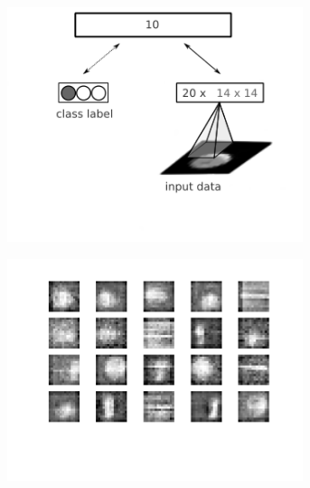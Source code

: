 \begin{figure}[h!]
	\centering
	\begin{subfigure}{.32\textwidth}
  		\centering
    	\includegraphics[width=0.95\textwidth]{imgs/bcp/dbn_bcp1.png} 
    \caption{}
	\label{fig:bcpdbnarch}
	\end{subfigure}%
	\begin{subfigure}{.32\textwidth}
  		\centering
    	\includegraphics[width=0.95\textwidth]{imgs/bcp/w.png} 
    \caption{}
	\label{fig:bcpw}
	\end{subfigure}%
	\begin{subfigure}{.32\textwidth}
  		\centering

\end{subfigure}
\end{figure}
